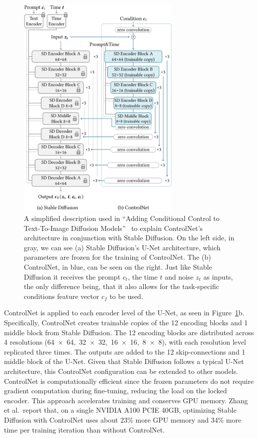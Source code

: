 \begin{figure}
    \centering
    \includegraphics[width=0.7\textwidth]{assets/control_net_sd_architecture.pdf}
    \caption{A simplified description used in ``Adding Conditional Control to Text-To-Image Diffusion Models''~\cite{zhang2023addingconditionalcontroltexttoimage} to explain ControlNet's architecture in conjunction with Stable Diffusion. On the left side, in gray, we can see (a) Stable Diffusion's U-Net architecture, which parameters are frozen for the training of ControlNet. The (b) ControlNet, in blue, can be seen on the right. Just like Stable Diffusion it receives the prompt $c_t$, the time $t$ and noise $z_t$ as inputs, the only difference being, that it also allows for the task-specific conditions feature vector $c_f$ to be used.}
    \label{fig:control_net:sd_architecture}
\end{figure}
ControlNet is applied to each encoder level of the U-Net, as seen in Figure~\ref{fig:control_net:sd_architecture}b. Specifically, ControlNet creates trainable copies of the 12 encoding blocks and 1 middle block from Stable Diffusion. The 12 encoding blocks are distributed across 4 resolutions (64~$\times$~64,~32~$\times$~32,~16~$\times$~16,~8~$\times$~8), with each resolution level replicated three times. The outputs are added to the 12 skip-connections and 1 middle block of the U-Net. Given that Stable Diffusion follows a typical U-Net architecture, this ControlNet configuration can be extended to other models. ControlNet is computationally efficient since the frozen parameters do not require gradient computation during fine-tuning, reducing the load on the locked encoder. This approach accelerates training and conserves GPU memory. Zhang et al.\ report that, on a single NVIDIA A100 PCIE 40GB, optimizing Stable Diffusion with ControlNet uses about 23\% more GPU memory and 34\% more time per training iteration than without ControlNet.

